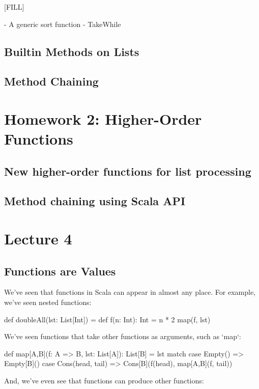 \documentclass{book}
\begin{document}
[FILL]

- A generic sort function
- TakeWhile

\section{Builtin Methods on Lists}

\section{Method Chaining}

\chapter{Homework 2: Higher-Order Functions}

\section{New higher-order functions for list processing}
\section{Method chaining using Scala API}

\chapter{Lecture 4}

\section{Functions are Values}

We've seen that functions in Scala can appear in almost any place. For example,
we've seen nested functions:

\begin{scalacode}
def doubleAll(lst: List[Int]) = {
  def f(n: Int): Int = n * 2
  map(f, lst)
}
\end{scalacode}

We've seen functions that take other functions as arguments, such as `map`:

\begin{scalacode}
def map[A,B](f: A => B, lst: List[A]): List[B] = lst match {
  case Empty() => Empty[B]()
  case Cons(head, tail) => Cons[B](f(head), map[A,B](f, tail))
}
\end{scalacode}

And, we've even see that functions can produce other functions:
\end{document}
